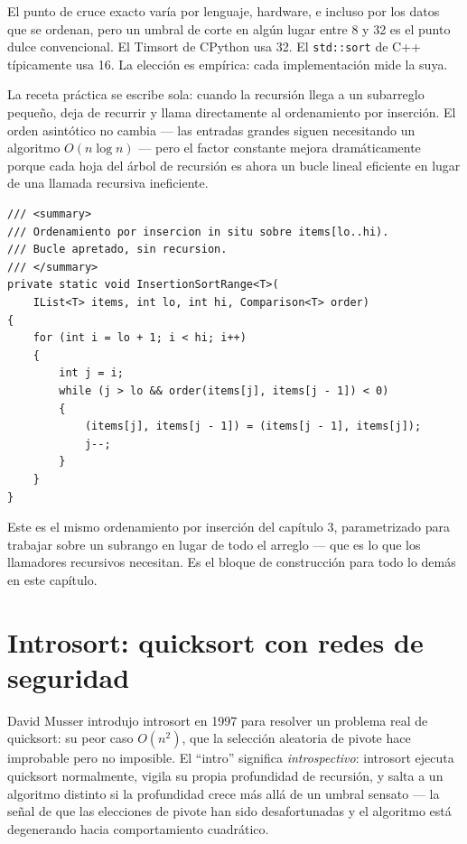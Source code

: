 \documentclass[11pt,a4paper]{article}
\begin{document}
El punto de cruce exacto varía por lenguaje, hardware, e incluso por los datos que se ordenan, pero un umbral de corte en algún lugar entre 8 y 32 es el punto dulce convencional. El Timsort de CPython usa 32. El \texttt{std::sort} de C++ típicamente usa 16. La elección es empírica: cada implementación mide la suya.

La receta práctica se escribe sola: cuando la recursión llega a un subarreglo pequeño, deja de recurrir y llama directamente al ordenamiento por inserción. El orden asintótico no cambia --- las entradas grandes siguen necesitando un algoritmo $O(n \log n)$ --- pero el factor constante mejora dramáticamente porque cada hoja del árbol de recursión es ahora un bucle lineal eficiente en lugar de una llamada recursiva ineficiente.

\begin{lstlisting}[caption={Ordenamiento por inserción sobre un rango}]
/// <summary>
/// Ordenamiento por insercion in situ sobre items[lo..hi).
/// Bucle apretado, sin recursion.
/// </summary>
private static void InsertionSortRange<T>(
    IList<T> items, int lo, int hi, Comparison<T> order)
{
    for (int i = lo + 1; i < hi; i++)
    {
        int j = i;
        while (j > lo && order(items[j], items[j - 1]) < 0)
        {
            (items[j], items[j - 1]) = (items[j - 1], items[j]);
            j--;
        }
    }
}
\end{lstlisting}

Este es el mismo ordenamiento por inserción del capítulo 3, parametrizado para trabajar sobre un subrango en lugar de todo el arreglo --- que es lo que los llamadores recursivos necesitan. Es el bloque de construcción para todo lo demás en este capítulo.

\section{Introsort: quicksort con redes de seguridad}

David Musser introdujo introsort en 1997 para resolver un problema real de quicksort: su peor caso $O(n^2)$, que la selección aleatoria de pivote hace improbable pero no imposible. El ``intro'' significa \emph{introspectivo}: introsort ejecuta quicksort normalmente, vigila su propia profundidad de recursión, y salta a un algoritmo distinto si la profundidad crece más allá de un umbral sensato --- la señal de que las elecciones de pivote han sido desafortunadas y el algoritmo está degenerando hacia comportamiento cuadrático.
\end{document}
